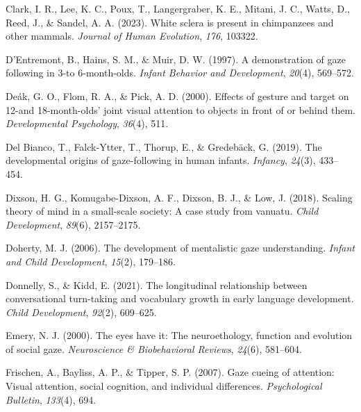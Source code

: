 \documentclass[
  man,floatsintext]{apa7}
\newlength{\cslhangindent}
\newlength{\cslentryspacingunit} %
\newenvironment{CSLReferences}[2] %
 {%
  \setlength{\parindent}{0pt}
  \ifodd #1
  \let\oldpar\par
  \def\par{\hangindent=\cslhangindent\oldpar}
  \fi
  \setlength{\parskip}{#2\cslentryspacingunit}
 }%
 {}
\begin{document}
\begin{CSLReferences}{1}{0}
\leavevmode{}%
Clark, I. R., Lee, K. C., Poux, T., Langergraber, K. E., Mitani, J. C., Watts, D., Reed, J., \& Sandel, A. A. (2023). White sclera is present in chimpanzees and other mammals. \emph{Journal of Human Evolution}, \emph{176}, 103322.

\leavevmode{}%
D'Entremont, B., Hains, S. M., \& Muir, D. W. (1997). A demonstration of gaze following in 3-to 6-month-olds. \emph{Infant Behavior and Development}, \emph{20}(4), 569--572.

\leavevmode{}%
Deák, G. O., Flom, R. A., \& Pick, A. D. (2000). Effects of gesture and target on 12-and 18-month-olds' joint visual attention to objects in front of or behind them. \emph{Developmental Psychology}, \emph{36}(4), 511.

\leavevmode{}%
Del Bianco, T., Falck-Ytter, T., Thorup, E., \& Gredebäck, G. (2019). The developmental origins of gaze-following in human infants. \emph{Infancy}, \emph{24}(3), 433--454.

\leavevmode{}%
Dixson, H. G., Komugabe-Dixson, A. F., Dixson, B. J., \& Low, J. (2018). Scaling theory of mind in a small-scale society: A case study from vanuatu. \emph{Child Development}, \emph{89}(6), 2157--2175.

\leavevmode{}%
Doherty, M. J. (2006). The development of mentalistic gaze understanding. \emph{Infant and Child Development}, \emph{15}(2), 179--186.

\leavevmode{}%
Donnelly, S., \& Kidd, E. (2021). The longitudinal relationship between conversational turn-taking and vocabulary growth in early language development. \emph{Child Development}, \emph{92}(2), 609--625.

\leavevmode{}%
Emery, N. J. (2000). The eyes have it: The neuroethology, function and evolution of social gaze. \emph{Neuroscience \& Biobehavioral Reviews}, \emph{24}(6), 581--604.

\leavevmode{}%
Frischen, A., Bayliss, A. P., \& Tipper, S. P. (2007). Gaze cueing of attention: Visual attention, social cognition, and individual differences. \emph{Psychological Bulletin}, \emph{133}(4), 694.


\end{CSLReferences}
\end{document}
